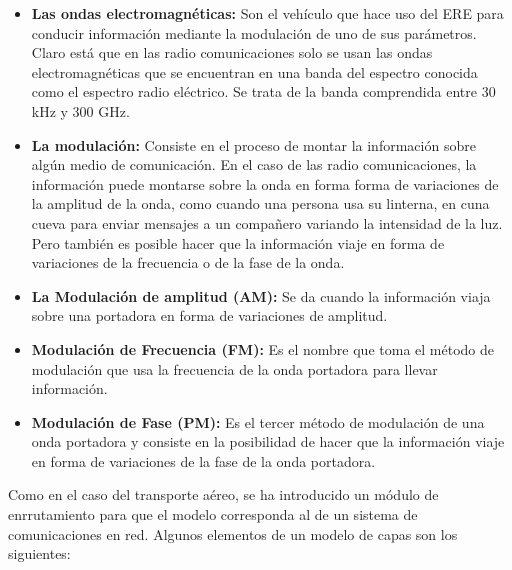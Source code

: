 \begin{itemize}
	\item  \textbf{Las ondas electromagnéticas:} Son el vehículo que hace uso del ERE para conducir información mediante la modulación de uno de sus parámetros. Claro está que en las radio comunicaciones solo se usan las ondas electromagnéticas que se encuentran en una banda del espectro conocida como el espectro radio eléctrico. Se trata de la banda comprendida entre 30 kHz y 300 GHz.
    \item  \textbf{ La modulación:} Consiste en el proceso de montar la información sobre algún medio de comunicación. En el caso de las radio comunicaciones, la información puede montarse sobre la onda en forma forma de variaciones de la amplitud de la onda, como cuando una persona usa su linterna, en cuna cueva para enviar mensajes a un compañero variando la intensidad de la luz. Pero también es posible hacer que la información viaje en forma de variaciones de la frecuencia o de la fase de la onda. 
    \item  \textbf{La Modulación de amplitud (AM):} Se da cuando la información viaja sobre una portadora en forma de variaciones de amplitud.
    \item  \textbf{Modulación de Frecuencia (FM):} Es el nombre que toma el método de modulación que usa la frecuencia de la onda portadora para llevar información.
    \item  \textbf{Modulación de Fase (PM):} Es el tercer método de modulación de una onda portadora y consiste en la posibilidad de hacer que la información viaje en forma de variaciones de la fase de la onda portadora.
\end{itemize}

Como en el caso del transporte aéreo, se ha introducido un módulo de enrrutamiento para que el modelo corresponda al de un sistema de comunicaciones en red. Algunos elementos de un modelo de capas son los siguientes:

